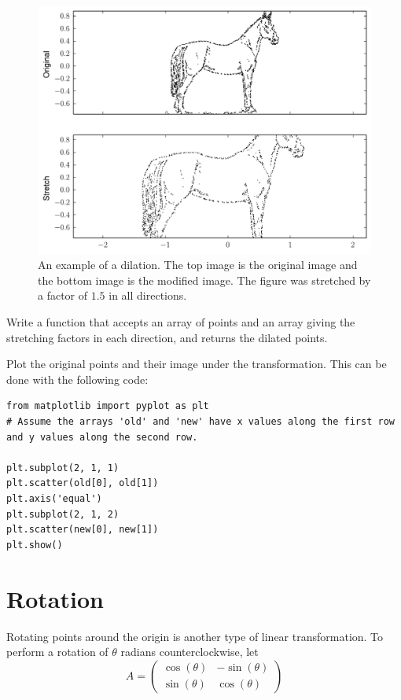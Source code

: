 \begin{figure}
\includegraphics[width=\textwidth]{stretch.pdf}
\caption{An example of a dilation. The top image is the original image and the bottom image is the modified image. The figure was stretched by a factor of $1.5$ in all directions.}
\end{figure}

\begin{problem}
Write a function that accepts an array of points and an array giving the stretching factors in each direction, and returns the dilated points. 

Plot the original points and their image under the transformation. This can be done with the following code:
\begin{lstlisting}
from matplotlib import pyplot as plt
# Assume the arrays 'old' and 'new' have x values along the first row and y values along the second row.

plt.subplot(2, 1, 1)
plt.scatter(old[0], old[1])
plt.axis('equal')
plt.subplot(2, 1, 2)
plt.scatter(new[0], new[1])
plt.show()
\end{lstlisting}
\end{problem}

\section*{Rotation}
Rotating points around the origin is another type of linear transformation. To perform a rotation of $\theta$ radians counterclockwise, let
\[
A = \begin{pmatrix}
\cos(\theta) & -\sin(\theta) \\
\sin(\theta) & \cos(\theta)
\end{pmatrix}
\]

